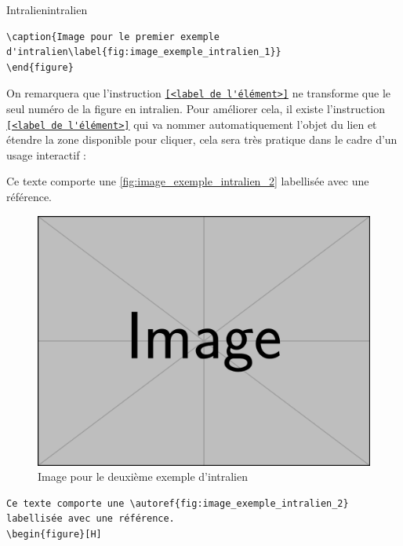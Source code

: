 \documentclass[a4paper, 11pt, twoside, fleqn]{memoir}
\begin{document}
\begin{exemple}{Intralien}{intralien}
\begin{minipage}[t]{0.49\linewidth}
\begin{verbatim}
\caption{Image pour le premier exemple d'intralien\label{fig:image_exemple_intralien_1}}
\end{figure}
	\end{verbatim}
	\end{minipage}
	
	On remarquera que l'instruction \texttt{\ref{<label de l'élément>}} ne transforme que le seul numéro de la figure en intralien. Pour améliorer cela, il existe l'instruction \texttt{\autoref{<label de l'élément>}} qui va nommer automatiquement l'objet du lien et étendre la zone disponible pour cliquer, cela sera très pratique dans le cadre d'un usage interactif :\\
	
		\begin{minipage}[t]{0.49\linewidth}
	Ce texte comporte une \autoref{fig:image_exemple_intralien_2} labellisée avec une référence.
	\begin{figure}[H]
	\includegraphics[width=\linewidth]{fig_image.png} 
	\caption{Image pour le deuxième exemple d'intralien\label{fig:image_exemple_intralien_2}}
	\end{figure}
	\end{minipage}
	\hfill
	\begin{minipage}[t]{0.49\linewidth}
	\begin{verbatim}
Ce texte comporte une \autoref{fig:image_exemple_intralien_2} labellisée avec une référence.
\begin{figure}[H]

\end{verbatim}
\end{minipage}
\end{exemple}
\end{document}
